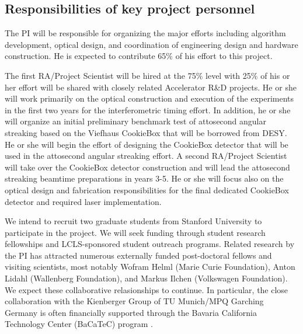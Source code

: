 \documentclass[letterpaper,oneside,11pt]{article}
\begin{document}
\subsection*{Responsibilities of key project personnel\label{personnell}}

The PI will be responsible for organizing the major efforts including algorithm development, optical design, and coordination of engineering design and hardware construction.
He is expected to contribute 65\% of his effort to this project.

The first RA/Project Scientist will be hired at the 75\% level with 25\% of his or her effort will be shared with closely related Accelerator R\&D projects.
He or she will work primarily on the optical construction and execution of the experiments in the first two years for the interferometric timing effort.
In addition, he or she will organize an initial preliminary benchmark test of attosecond angular streaking based on the Viefhaus CookieBox that will be borrowed from DESY.
He or she will begin the effort of designing the CookieBox detector that will be used in the attosecond angular streaking effort.
A second RA/Project Scientist will take over the CookieBox detector construction and will lead the attosecond streaking beamtime preparations in years 3-5.
He or she will focus also on the optical design and fabrication responsibilities for the final dedicated CookieBox detector and required laser implementation.

We intend to recruit two graduate students from Stanford University to participate in the project.
We will seek funding through student research fellowships and LCLS-sponsored student outreach programs.
Related research by the PI has attracted numerous externally funded post-doctoral fellows and visiting scientists, most notably Wofram Helml (Marie Curie Foundation), Anton Lidahl (Wallenberg Foundation), and Markus Ilchen (Volkswagen Foundation).
We expect these collaborative relasionships to continue.
In particular, the close collaboration with the Kienberger Group of TU Munich/MPQ Garching Germany is often financially supported through the Bavaria California Technology Center (BaCaTeC) program \cite{BaCaTeC}.





\clearpage
\appendix
\end{document}
